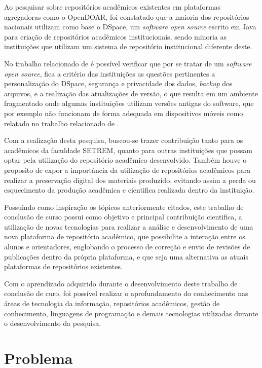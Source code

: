 Ao pesquisar sobre repositórios acadêmicos existentes em plataformas
agregadoras como o OpenDOAR, foi constatado que a maioria dos repositórios
nacionais utilizam como base o DSpace, um \emph{software open source}
escrito em Java para criação de repositórios acadêmicos institucionais,
sendo minoria as instituições que utilizam um sistema de repositório
institucional diferente deste.

No trabalho relacionado de \cite{GarciaRodrigoMoreira2019DdnB} é possível
verificar que por se tratar de um \emph{software open source},
fica a critério das instituições as questões pertinentes a personalização
do DSpace, segurança e privacidade dos dados, \emph{backup} dos arquivos,
e a realização das atualizações de versão, o que resulta em um ambiente
fragmentado onde algumas instituições utilizam versões antigas do software,
que por exemplo não funcionam de forma adequada em dispositivos móveis como
relatado no trabalho relacionado de \cite{FernandesMacedes:2018}.

Com a realização desta pesquisa, buscou-se trazer contribuição
tanto para os acadêmicos da faculdade SETREM, quanto para outras
instituições que possam optar pela utilização do repositório
acadêmico desenvolvido. Também houve o proposito de expor a
importância da utilização de repositórios acadêmicos para realizar
a preservação digital dos materiais produzido, evitando assim a perda
ou esquecimento da produção acadêmica e cientifica realizada dentro
da instituição.

Possuindo como inspiração os tópicos anteriormente citados,
este trabalho de conclusão de curso possui como objetivo e principal
contribuição cientifica, a utilização de novas tecnologias para realizar
a análise e desenvolvimento de uma nova plataforma de repositório
acadêmico, que possibilite a interação entre os alunos e orientadores,
englobando o processo de correção e envio de revisões de publicações
dentro da própria plataforma, e que seja uma alternativa as atuais
plataformas de repositórios existentes.

Com o aprendizado adquirido durante o desenvolvimento deste trabalho
de conclusão de curo, foi possível realizar o aprofundamento do
conhecimento nas áreas de tecnologia da informação, repositórios
acadêmicos, gestão de conhecimento, linguagens de programação e
demais tecnologias utilizadas durante o desenvolvimento da pesquisa.


\section{Problema} \label{sec::Problem}

